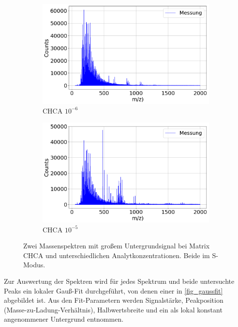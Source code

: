 \begin{figure}[!ht]
    \centering
    \begin{subfigure}{0.495\textwidth}
        \centering
        \includegraphics[width=1.0\textwidth]{img/b11_S_broken}
        \caption{CHCA $10^{-6}$}
        \label{fig_very_broken}
    \end{subfigure}
    \begin{subfigure}{0.495\textwidth}
        \centering
        \includegraphics[width=1.0\textwidth]{img/C11_S_broken_but_fine}
        \caption{CHCA $10^{-5}$}
        \label{fig_fine_broken}
    \end{subfigure}
    \caption{Zwei Massenspektren mit großem Untergrundsignal bei Matrix CHCA und unterschiedlichen Analytkonzentrationen. Beide im S-Modus.}
    \label{fig_broken}
\end{figure}

Zur Auswertung der Spektren wird für jedes Spektrum und beide untersuchte Peaks ein lokaler Gauß-Fit durchgeführt, von denen einer in \cref{fig_gaussfit} abgebildet ist.
Aus den Fit-Parametern werden Signalstärke, Peakposition (Masse-zu-Ladung-Verhältnis), Halbwertsbreite und ein als lokal konstant angenommener Untergrund entnommen.

